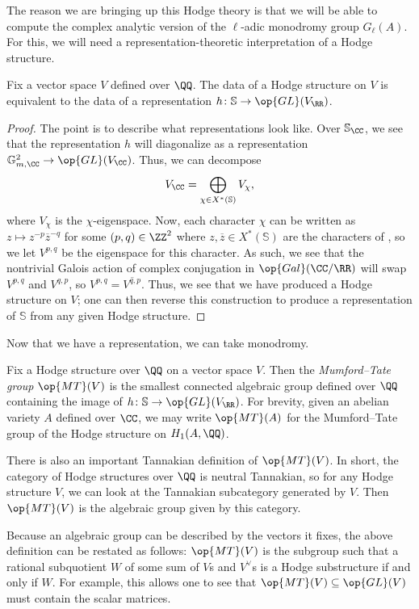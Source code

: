 \documentclass{article}
\begin{document}
The reason we are bringing up this Hodge theory is that we will be able to compute the complex analytic version of the $\ell$-adic monodromy group $G_\ell(A)$. For this, we will need a representation-theoretic interpretation of a Hodge structure.
\begin{lemma}
	Fix a vector space $V$ defined over $\QQ$. The data of a Hodge structure on $V$ is equivalent to the data of a representation $h\colon\mathbb S\to\op{GL}(V_\RR)$.
\end{lemma}
\begin{proof}
	The point is to describe what representations look like. Over $\mathbb S_\CC$, we see that the representation $h$ will diagonalize as a representation $\mathbb G_{m,\CC}^2\to\op{GL}(V_\CC)$. Thus, we can decompose
	\[V_\CC=\bigoplus_{\chi\in X^*(\mathbb S)}V_\chi,\]
	where $V_\chi$ is the $\chi$-eigenspace. Now, each character $\chi$ can be written as $z\mapsto z^{-p}\overline z^{-q}$ for some $(p,q)\in\ZZ^2$ where $z,\overline z\in X^*(\mathbb S)$ are the characters of , so we let $V^{p,q}$ be the eigenspace for this character. As such, we see that the nontrivial Galois action of complex conjugation in $\op{Gal}(\CC/\RR)$ will swap $V^{p,q}$ and $V^{q,p}$, so $V^{p,q}=\overline{V^{q,p}}$. Thus, we see that we have produced a Hodge structure on $V$; one can then reverse this construction to produce a representation of $\mathbb S$ from any given Hodge structure.
\end{proof}
Now that we have a representation, we can take monodromy.
\begin{definition}
	Fix a Hodge structure over $\QQ$ on a vector space $V$. Then the \textit{Mumford--Tate group} $\op{MT}(V)$ is the smallest connected algebraic group defined over $\QQ$ containing the image of $h\colon\mathbb S\to\op{GL}(V_\RR)$. For brevity, given an abelian variety $A$ defined over $\CC$, we may write $\op{MT}(A)$ for the Mumford--Tate group of the Hodge structure on $H_1(A,\QQ)$.
\end{definition}
\begin{remark}
	There is also an important Tannakian definition of $\op{MT}(V)$. In short, the category of Hodge structures over $\QQ$ is neutral Tannakian, so for any Hodge structure $V$, we can look at the Tannakian subcategory generated by $V$. Then $\op{MT}(V)$ is the algebraic group given by this category.
\end{remark}
\begin{remark}
	Because an algebraic group can be described by the vectors it fixes, the above definition can be restated as follows: $\op{MT}(V)$ is the subgroup such that a rational subquotient $W$ of some sum of $V$s and $V^\lor$s is a Hodge substructure if and only if $W$. For example, this allows one to see that $\op{MT}(V)\subseteq\op{GL}(V)$ must contain the scalar matrices.
\end{remark}
\end{document}
